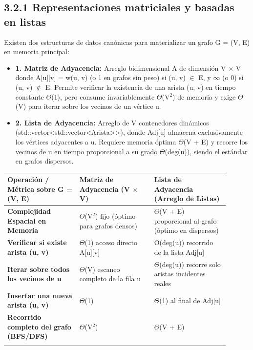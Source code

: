 \documentclass[11pt,letterpaper]{article}
\begin{document}
\subsection*{3.2.1 Representaciones matriciales y basadas en listas}
Existen dos estructuras de datos canónicas para materializar un grafo G = (V, E) en memoria principal:\par
\begin{itemize}
\setlength{\itemsep}{2pt}\setlength{\parskip}{0pt}
  \item \textbf{1. Matriz de Adyacencia: }Arreglo bidimensional A de dimensión V $\times$ V donde A[u][v] = w(u, v) (o 1 en grafos sin peso) si (u, v) $\in$ E, y $\infty$ (o 0) si (u, v) $\notin$ E. Permite verificar la existencia de una arista (u, v) en tiempo constante $\Theta$(1), pero consume invariablemente $\Theta$(V$^2$) de memoria y exige $\Theta$(V) para iterar sobre los vecinos de un vértice u.
  \item \textbf{2. Lista de Adyacencia: }Arreglo de V contenedores dinámicos (std::vector<std::vector<Arista>>), donde Adj[u] almacena exclusivamente los vértices adyacentes a u. Requiere memoria óptima $\Theta$(V + E) y recorre los vecinos de u en tiempo proporcional a su grado $\Theta$(deg(u)), siendo el estándar en grafos dispersos.
\end{itemize}
\vspace{4pt}\noindent
\begin{tabular}{>{\raggedright\arraybackslash}p{0.291\linewidth}>{\raggedright\arraybackslash}p{0.305\linewidth}>{\raggedright\arraybackslash}p{0.305\linewidth}}
\toprule
\textbf{\color{ipnguinda}Operación / Métrica sobre G = (V, E)} & \textbf{\color{ipnguinda}Matriz de Adyacencia (V $\times$ V)} & \textbf{\color{ipnguinda}Lista de Adyacencia (Arreglo de Listas)} \\
\midrule
\textbf{Complejidad Espacial en Memoria} & $\Theta$(V$^2$) fijo (óptimo para grafos densos) & $\Theta$(V + E) proporcional al grafo (óptimo en dispersos) \\
\addlinespace[3pt]
\textbf{Verificar si existe arista (u, v)} & $\Theta$(1) acceso directo A[u][v] & O(deg(u)) recorrido de la lista Adj[u] \\
\addlinespace[3pt]
\textbf{Iterar sobre todos los vecinos de u} & $\Theta$(V) escaneo completo de la fila u & $\Theta$(deg(u)) recorre solo aristas incidentes reales \\
\addlinespace[3pt]
\textbf{Insertar una nueva arista (u, v)} & $\Theta$(1) & $\Theta$(1) al final de Adj[u] \\
\addlinespace[3pt]
\textbf{Recorrido completo del grafo (BFS/DFS)} & $\Theta$(V$^2$) & $\Theta$(V + E) \\
\addlinespace[3pt]
\bottomrule
\end{tabular}
\end{document}
